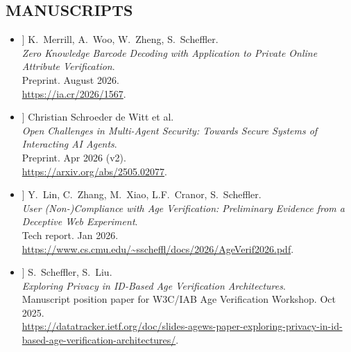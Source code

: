 \documentclass{res}
\begin{document}
\begin{resume}
\section{MANUSCRIPTS}
\vspace{0.25in}

\edef\zkbarcodes{[\arabic{citctr}]}
\edef\openmultiagent{[\arabic{citctr}]}
\edef\ageverifftc{[\arabic{citctr}]}
\edef\exploringav{[\arabic{citctr}]}
\edef\synopsis{[\arabic{citctr}]}
\edef\ageVerifPrimeTime{[\arabic{citctr}]}
\edef\scramDeviations{[\arabic{citctr}]}
\edef\autonomousWeapons{[\arabic{citctr}]}
\edef\bog{[\arabic{citctr}]}


\begin{itemize}
\item[\zkbarcodes] K.~Merrill, A.~Woo, W.~Zheng, S.~Scheffler. \\
\emph{Zero Knowledge Barcode Decoding with Application to Private Online Attribute Verification}. \\
Preprint.
August 2026. \\
\url{https://ia.cr/2026/1567}.

\item[\openmultiagent] Christian Schroeder de Witt et al. \\
\emph{Open Challenges in Multi-Agent Security: Towards Secure Systems of Interacting AI Agents}. \\
Preprint.
Apr 2026 (v2). \\
\url{https://arxiv.org/abs/2505.02077}.

\item[\ageverifftc] Y.~Lin, C.~Zhang, M.~Xiao, L.F.~Cranor, S.~Scheffler. \\
\emph{User (Non-)Compliance with Age Verification: Preliminary Evidence from a Deceptive Web Experiment}. \\
Tech report.
Jan 2026.  \\
\url{https://www.cs.cmu.edu/~sscheffl/docs/2026/AgeVerif2026.pdf}.

\item[\exploringav] S.~Scheffler, S.~Liu. \\
\emph{Exploring Privacy in ID-Based Age Verification Architectures}. \\
Manuscript position paper for W3C/IAB Age Verification Workshop.
Oct 2025. \\
\url{https://datatracker.ietf.org/doc/slides-agews-paper-exploring-privacy-in-id-based-age-verification-architectures/}.


\end{itemize}
\end{resume}
\end{document}
